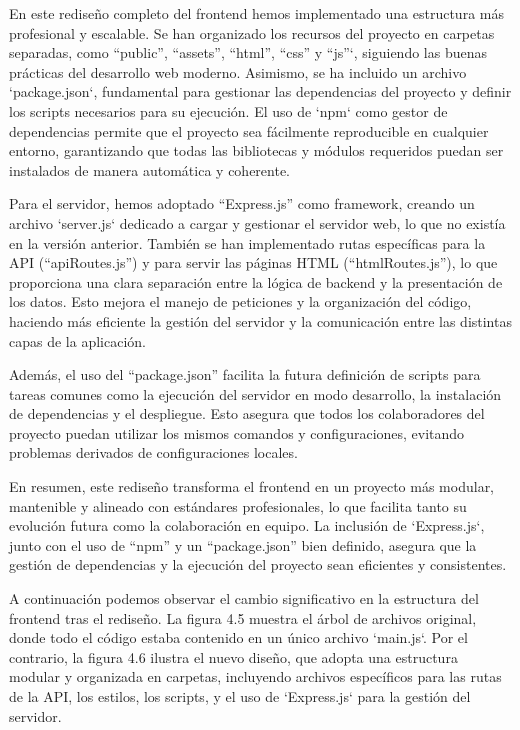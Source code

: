 \documentclass[a4paper, 12pt]{book}
\begin{document}
En este rediseño completo del frontend hemos implementado una estructura más profesional y escalable. Se han organizado los recursos del proyecto en carpetas separadas, como ``public'', ``assets'', ``html'', ``css'' y ``js''`, siguiendo las buenas prácticas del desarrollo web moderno. Asimismo, se ha incluido un archivo `package.json`, fundamental para gestionar las dependencias del proyecto y definir los scripts necesarios para su ejecución. El uso de `npm` como gestor de dependencias permite que el proyecto sea fácilmente reproducible en cualquier entorno, garantizando que todas las bibliotecas y módulos requeridos puedan ser instalados de manera automática y coherente.

Para el servidor, hemos adoptado ``Express.js'' como framework, creando un archivo `server.js` dedicado a cargar y gestionar el servidor web, lo que no existía en la versión anterior. También se han implementado rutas específicas para la API (``apiRoutes.js'') y para servir las páginas HTML (``htmlRoutes.js''), lo que proporciona una clara separación entre la lógica de backend y la presentación de los datos. Esto mejora el manejo de peticiones y la organización del código, haciendo más eficiente la gestión del servidor y la comunicación entre las distintas capas de la aplicación.

Además, el uso del ``package.json'' facilita la futura definición de scripts para tareas comunes como la ejecución del servidor en modo desarrollo, la instalación de dependencias y el despliegue. Esto asegura que todos los colaboradores del proyecto puedan utilizar los mismos comandos y configuraciones, evitando problemas derivados de configuraciones locales.

En resumen, este rediseño transforma el frontend en un proyecto más modular, mantenible y alineado con estándares profesionales, lo que facilita tanto su evolución futura como la colaboración en equipo. La inclusión de `Express.js`, junto con el uso de ``npm'' y un ``package.json'' bien definido, asegura que la gestión de dependencias y la ejecución del proyecto sean eficientes y consistentes.

A continuación podemos observar el cambio significativo en la estructura del frontend tras el rediseño. La figura 4.5 muestra el árbol de archivos original, donde todo el código estaba contenido en un único archivo `main.js`. Por el contrario, la figura 4.6 ilustra el nuevo diseño, que adopta una estructura modular y organizada en carpetas, incluyendo archivos específicos para las rutas de la API, los estilos, los scripts, y el uso de `Express.js` para la gestión del servidor.
\end{document}
